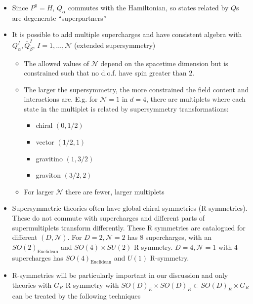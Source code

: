 \begin{itemize}
    \item Since $P^0 = H$, $Q_\alpha$ commutes with the Hamiltonian, so states related by $Q$s are degenerate ``superpartners''
    \item It is possible to add multiple supercharges and have consistent algebra with $Q_\alpha^I, \bar{Q}_{\dot{\beta}}^I$, $I = 1, \ldots, \mathcal{N}$ (extended supersymmetry)
    \begin{itemize}
        \item The allowed values of $\mathcal{N}$ depend on the spacetime dimension but is constrained such that no d.o.f. have spin greater than $2$.
        \item The larger the supersymmetry, the more constrained the field content and interactions are. E.g. for $\mathcal{N} = 1$ in $d = 4$, there are multiplets where each state in the multiplet is related by supersymmetry transformations:
        \begin{itemize}
            \item chiral $(0, 1/2)$
            \item vector $(1/2, 1)$
            \item gravitino $(1, 3/2)$
            \item graviton $(3/2, 2)$
        \end{itemize}
        \item For larger $\mathcal{N}$ there are fewer, larger multiplets
    \end{itemize}
    \item Supersymmetric theories often have global chiral symmetries (R-symmetries). These do not commute with supercharges and different parts of supermultiplets transform differently. These R symmetries are catalogued for different $(D, \mathcal{N})$. For $D=2, \mathcal{N}=2$ has $8$ supercharges, with an $SO(2)_\text{Euclidean}$ and $SO(4) \times SU(2)$ R-symmetry. $D=4, \mathcal{N} = 1$ with $4$ supercharges has $SO(4)_\text{Euclidean}$ and $U(1)$ R-symmetry.
    \item R-symmetries will be particularly important in our discussion and only theories with $G_R$ R-symmetry with $SO(D)_E \times SO(D)_R \subset SO(D)_E \times G_R$ can be treated by the following techniques
\end{itemize}

